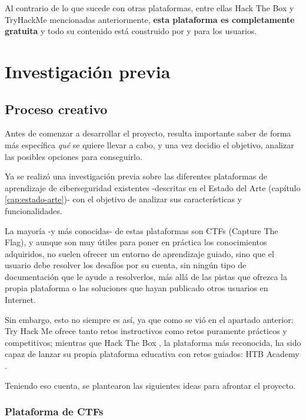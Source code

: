         Al contrario de lo que sucede con otras plataformas, entre ellas Hack The Box y TryHackMe mencionadas anteriormente, \textbf{esta plataforma es completamente gratuita} y todo su contenido está construido por y para los usuarios.
        
        \cleardoublepage
    
    

\chapter{Investigación previa}
    \label{cap:investigacion-previa}

    \section{Proceso creativo}
        \label{sec:proceso-creativo}

        Antes de comenzar a desarrollar el proyecto, resulta importante saber de forma más específica \textit{qué} se quiere llevar a cabo, y una vez decidio el objetivo, analizar las posibles opciones para conseguirlo.
        
        Ya se realizó una investigación previa sobre las diferentes plataformas de aprendizaje de ciberseguridad existentes -descritas en el Estado del Arte (capítulo \ref{cap:estado-arte})- con el objetivo de analizar sus características y funcionalidades.
        
        La mayoría -y más conocidas- de estas plataformas son CTFs (Capture The Flag), y aunque son muy útiles para poner en práctica los conocimientos adquiridos, no suelen ofrecer un entorno de aprendizaje guiado, sino que el usuario debe resolver los desafíos por su cuenta, sin ningún tipo de documentación que le ayude a resolverlos, más allá de las pistas que ofrezca la propia plataforma o las soluciones que hayan publicado otros usuarios en Internet.

        Sin embargo, esto no siempre es así, ya que como se vió en el apartado anterior: Try Hack Me \cite{tryhackme} ofrece tanto retos instructivos como retos puramente prácticos y competitivos; mientras que Hack The Box \cite{hackthebox}, la plataforma más reconocida, ha sido capaz de lanzar su propia plataforma educativa con retos guiados: HTB Academy \cite{hackthebox-academy}.

        Teniendo eso cuenta, se plantearon las siguientes ideas para afrontar el proyecto.

        \subsection{Plataforma de CTFs}

